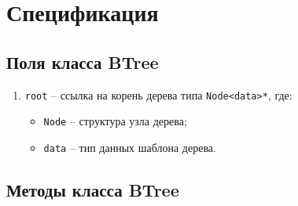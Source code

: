 \section{Спецификация}


\subsection{Поля класса BTree}


\begin{enumerate}
    \item \texttt{root} -- ссылка на корень дерева типа \texttt{Node<data>*}, где:
        \begin{itemize}
            \item \texttt{Node} -- структура узла дерева;
            \item \texttt{data} -- тип данных шаблона дерева.
        \end{itemize}
\end{enumerate}


\subsection{Методы класса BTree}



